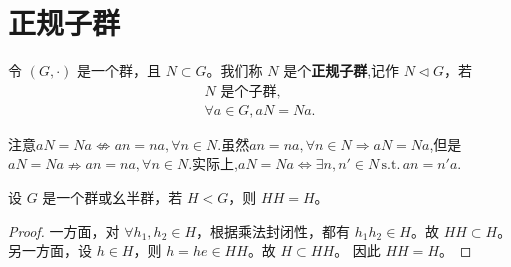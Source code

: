 \documentclass[../../main.tex]{subfiles}
\begin{document}
\section{正规子群}

\begin{definition}[正规子群]
令 $(G,\cdot)$ 是一个群，且 $N\subset G$。我们称 $N$ 是个\textbf{正规子群},记作 $N\lhd G$，若
\begin{gather*}
N\text{ 是个子群},\\
\forall a\in G, aN = Na.
\end{gather*}
\end{definition}
\begin{remark}
注意$aN=Na\nLeftrightarrow an=na,\forall n\in N.$虽然$an=na,\forall n\in N\Rightarrow aN=Na$,但是$aN=Na\nRightarrow an=na,\forall n\in N.$实际上,$aN=Na\Leftrightarrow \exists n,n' \in N\,\mathrm{s}.\mathrm{t}.\,an=n'a.$
\end{remark}

\begin{lemma}\label{lemma:子群或子幺半群与自身的乘积还等于其本身}
设 $G$ 是一个群或幺半群，若 $H < G$，则 $HH = H$。
\end{lemma}
\begin{proof}
一方面，对 $\forall h_1,h_2\in H$，根据乘法封闭性，都有 $h_1h_2\in H$。故 $HH\subset H$。
另一方面，设 $h\in H$，则 $h = he\in HH$。故 $H\subset HH$。
因此 $HH = H$。 
\end{proof}
\end{document}
